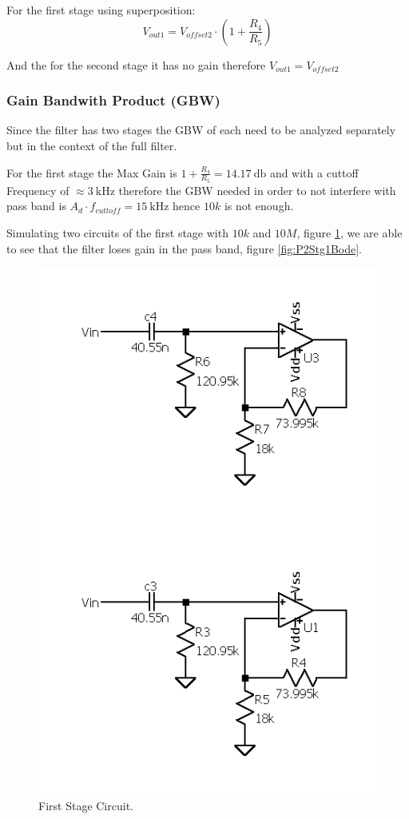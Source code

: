 For the first stage using superposition:
\begin{equation}
    V_{out1}=V_{offset2}\cdot\left (1 + \frac{R_4}{R_5}\right )
\end{equation}

And the for the second stage it has no gain therefore $V_{out1} = V_{offset2}$ 
\subsubsection{Gain Bandwith Product (GBW)}

Since the filter has two stages the GBW of each need to be analyzed separately but in the context of the full filter.

For the first stage the Max Gain is $1 + \frac{R_4}{R_5} = \SI{14.17}{\decibel}$ and with a cuttoff Frequency of $\approx \SI{3}{\kilo\hertz}$ therefore the GBW needed in order to not interfere with pass band is $A_d \cdot f_{cuttoff}= \SI{15}{\kilo\hertz}$ hence $10k$ is not enough.

Simulating two circuits of the first stage with $10k$ and $10M$, figure \ref{fig:P2Stg1GBW}, we are able to see that the filter loses gain in the pass band, figure \ref{fig:P2Stg1Bode}.

\begin{figure}[H]
    \centering
    \includegraphics*[scale = 0.4]{Images/P2CircGBWStg1.png}
    \caption{First Stage Circuit.}
    \label{fig:P2Stg1GBW}
\end{figure}


